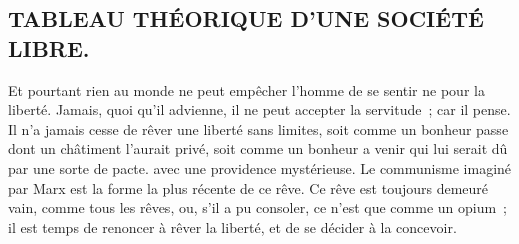 \documentclass[french,twoside]{book} %
\begin{document}
\subsection[TABLEAU THÉORIQUE D’UNE SOCIÉTÉ LIBRE.]{TABLEAU THÉORIQUE D’UNE SOCIÉTÉ LIBRE.}
\noindent Et pourtant rien au monde ne peut empêcher l'homme de se sentir ne pour la liberté. Jamais, quoi qu'il advienne, il ne peut accepter la servitude ; car il pense. Il n'a jamais cesse de rêver une liberté sans limites, soit comme un bonheur passe dont un châtiment l'aurait privé, soit comme un bonheur a venir qui lui serait dû par une sorte de pacte. avec une providence mystérieuse. Le communisme imaginé par Marx est la forme la plus récente de ce rêve. Ce rêve est toujours demeuré vain, comme tous les rêves, ou, s'il a pu consoler, ce n'est que comme un opium ; il est temps de renoncer à rêver la liberté, et de se décider à la concevoir.\par
\end{document}
